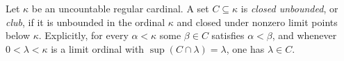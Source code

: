 
Let $\kappa$ be an uncountable regular cardinal. A set $C\subseteq\kappa$ is \emph{closed unbounded}, or \emph{club}, if it is unbounded in the ordinal $\kappa$ and closed under nonzero limit points below $\kappa$. Explicitly, for every $\alpha<\kappa$ some $\beta\in C$ satisfies $\alpha<\beta$, and whenever $0<\lambda<\kappa$ is a limit ordinal with $\sup(C\cap\lambda)=\lambda$, one has $\lambda\in C$.
